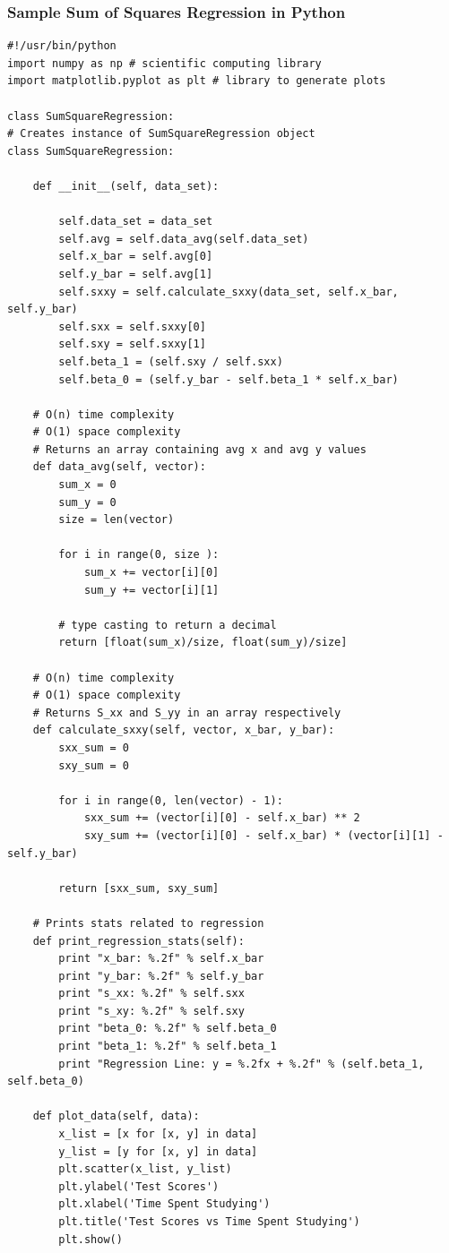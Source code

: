 \documentclass[12pt]{article}
\begin{document}
\subsubsection{Sample Sum of Squares Regression in Python}
\begin{lstlisting}
#!/usr/bin/python
import numpy as np # scientific computing library
import matplotlib.pyplot as plt # library to generate plots

class SumSquareRegression:
# Creates instance of SumSquareRegression object	
class SumSquareRegression:
	
	def __init__(self, data_set):

		self.data_set = data_set
		self.avg = self.data_avg(self.data_set)
		self.x_bar = self.avg[0]
		self.y_bar = self.avg[1]
		self.sxxy = self.calculate_sxxy(data_set, self.x_bar, self.y_bar)
		self.sxx = self.sxxy[0]
		self.sxy = self.sxxy[1]
		self.beta_1 = (self.sxy / self.sxx)
		self.beta_0 = (self.y_bar - self.beta_1 * self.x_bar)

	# O(n) time complexity
	# O(1) space complexity
	# Returns an array containing avg x and avg y values
	def data_avg(self, vector):
		sum_x = 0
		sum_y = 0
		size = len(vector) 

		for i in range(0, size ):
			sum_x += vector[i][0]
			sum_y += vector[i][1]

		# type casting to return a decimal
		return [float(sum_x)/size, float(sum_y)/size]

	# O(n) time complexity
	# O(1) space complexity
	# Returns S_xx and S_yy in an array respectively
	def calculate_sxxy(self, vector, x_bar, y_bar):
		sxx_sum = 0
		sxy_sum = 0

		for i in range(0, len(vector) - 1):
			sxx_sum += (vector[i][0] - self.x_bar) ** 2
			sxy_sum += (vector[i][0] - self.x_bar) * (vector[i][1] - self.y_bar)

		return [sxx_sum, sxy_sum]

	# Prints stats related to regression
	def print_regression_stats(self):
		print "x_bar: %.2f" % self.x_bar
		print "y_bar: %.2f" % self.y_bar
		print "s_xx: %.2f" % self.sxx
		print "s_xy: %.2f" % self.sxy
		print "beta_0: %.2f" % self.beta_0
		print "beta_1: %.2f" % self.beta_1
		print "Regression Line: y = %.2fx + %.2f" % (self.beta_1, self.beta_0)

	def plot_data(self, data):
		x_list = [x for [x, y] in data]
		y_list = [y for [x, y] in data]
		plt.scatter(x_list, y_list)
		plt.ylabel('Test Scores')
		plt.xlabel('Time Spent Studying')
		plt.title('Test Scores vs Time Spent Studying')
		plt.show()


\end{lstlisting}
\end{document}
